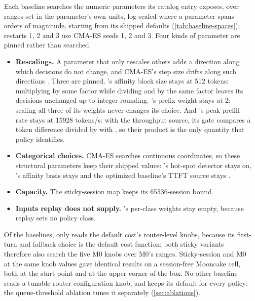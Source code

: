 Each baseline searches the numeric parameters its catalog entry exposes, over ranges set in the
parameter's own units, log-scaled where a parameter spans orders of magnitude, starting from its
shipped defaults (\cref{tab:baseline-spaces}); restarts 1, 2 and 3 use CMA-ES seeds 1, 2 and 3.
Four kinds of parameter are pinned rather than searched.
\begin{itemize}
  \item \textbf{Rescalings.} A parameter that only rescales others adds a direction along which
    decisions do not change, and CMA-ES's step size drifts along such directions
    \citep{hansen2016tutorial}. Three are pinned. 's affinity block size stays at
    512 tokens: multiplying  by some factor while dividing
     and  by the same factor leaves its decisions unchanged
    up to integer rounding. 's prefix weight stays at 2: scaling all
    three of its weights never changes its choice. And 's peak
    prefill rate stays at \num{15928} tokens/s: with the throughput source, its gate compares a
    token difference divided by  with
    , so their product is the only quantity that policy identifies.
  \item \textbf{Categorical choices.} CMA-ES searches continuous coordinates, so these structural
    parameters keep their shipped values: 's hot-spot detector stays on,
    's affinity basis stays  and the optimized baseline's TTFT source
    stays .
  \item \textbf{Capacity.} The sticky-session map keeps its \num{65536}-session bound.
  \item \textbf{Inputs replay does not supply.} 's per-class weights
    stay empty, because replay sets no policy class.
\end{itemize}
Of the baselines, only  reads the default cost's router-level knobs, because
its first-turn and fallback choice is the default cost function; both sticky variants therefore
also search the five M0 knobs over M0's ranges. Sticky-session and M0 at the same knob values gave
identical results on a session-free Mooncake cell, both at the start point and at the upper corner
of the box. No other baseline reads a tunable router-configuration knob, and
 keeps its default for every policy; the queue-threshold ablation
tunes it separately (\cref{sec:ablations}).


